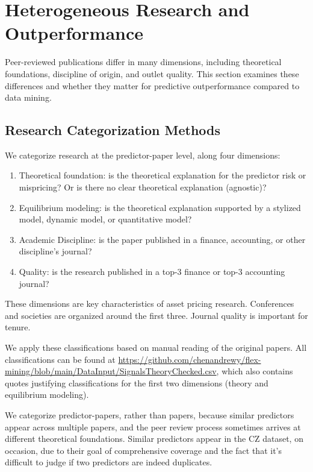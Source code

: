 \section{Heterogeneous Research and Outperformance}\label{sec:hetero}

Peer-reviewed publications differ in many dimensions, including theoretical foundations, discipline of origin, and outlet quality. This section examines these differences and whether they matter for predictive outperformance compared to data mining.


\subsection{Research Categorization Methods\label{sec:hetero-method}}

We categorize research at the predictor-paper level, along four dimensions:
\begin{enumerate}
   \item Theoretical foundation: is the theoretical explanation for the predictor risk or mispricing? Or is there no clear theoretical explanation (agnostic)?
   \item Equilibrium modeling: is the theoretical explanation supported by a stylized model, dynamic model, or quantitative model?
   \item Academic Discipline: is the paper published in a finance, accounting, or other discipline's journal?
   \item Quality: is the research published in a top-3 finance or top-3 accounting journal?
\end{enumerate}
These dimensions are key characteristics of asset pricing research. Conferences and societies are organized around the first three. Journal quality is important for tenure. 

We apply these classifications based on manual reading of the original papers. All classifications can be found at \url{https://github.com/chenandrewy/flex-mining/blob/main/DataInput/SignalsTheoryChecked.csv}, which also contains quotes justifying classifications for the first two dimensions (theory and equilibrium modeling).

We categorize predictor-papers, rather than papers, because similar predictors appear across multiple papers, and the peer review process sometimes arrives at different theoretical foundations. Similar predictors appear in the CZ dataset, on occasion, due to their goal of comprehensive coverage and the fact that it's difficult to judge if two predictors are indeed duplicates.


